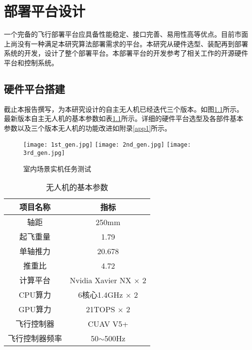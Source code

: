 
\chapter{部署平台设计}
一个完备的飞行部署平台应具备性能稳定、接口完善、易用性高等优点。目前市面上尚没有一种满足本研究算法部署需求的平台。本研究从硬件选型、装配再到部署系统的开发，设计了整个部署平台。本部署平台的开发参考了相关工作的开源硬件平台\cite{zhou2020ego}和控制系统\cite{Faessler18ral}。

\section{硬件平台搭建}

截止本报告撰写，为本研究设计的自主无人机已经迭代三个版本。如图\ref{fig_3gen}所示。最新版本自主无人机的基本参数如表\ref{tab_drone_param}所示。详细的硬件平台选型及各部件基本参数以及三个版本无人机的功能改进如附录\ref{app1}所示。

\begin{figure}
    \centering
      {\texttt{[image: 1st\_gen.jpg]}}
      {\texttt{[image: 2nd\_gen.jpg]}}
      {\texttt{[image: 3rd\_gen.jpg]}}
    \caption{室内场景实机任务测试}
    \label{fig_3gen}
\end{figure}
\begin{table}
    \centering
    \begin{tabular}{cc}
    \hline
        项目名称 & 指标 \\ \hline
         轴距 & 250mm \\ 
        起飞重量 & 1.79 \\ 
        单轴推力 & 20.678 \\ 
        推重比 & 4.72 \\ 
         计算平台 & Nvidia Xavier NX $\times$ 2 \\ 
        CPU算力 & 6核心1.4GHz $\times$ 2 \\ 
        GPU算力 & 21TOPS $\times$ 2 \\ 
         飞行控制器 & CUAV V5+ \\ 
        飞行控制器频率 & 50$\sim$500Hz \\ \hline
    \end{tabular}
    \caption{无人机的基本参数}
    \label{tab_drone_param}
\end{table}

